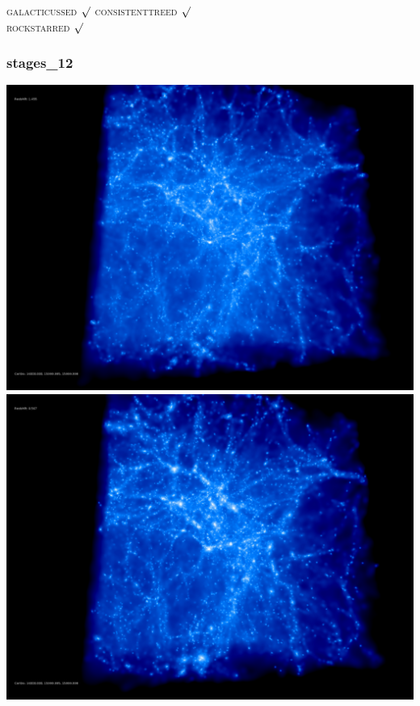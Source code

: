 \textsc{galacticussed} $\surd$
\textsc{consistenttreed} $\surd$ \\ 
\textsc{rockstarred} $\surd$
 
% 
%
%
%
%
%
%
%

\newpage
\subsubsection{stages\_12}

\includegraphics[scale=0.1]{r256/h100/stages_12/50.jpg} 
\includegraphics[scale=0.1]{r256/h100/stages_12/100.jpg}  \\

